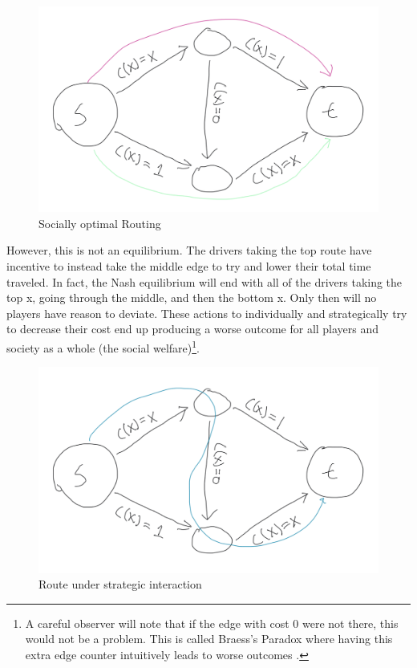 \documentclass[12pt,twoside]{reedthesis}
\begin{document}
\begin{figure}[h!]
	\centering
	\includegraphics[scale=0.35]{Figures/braess_optimal}
	\caption{Socially optimal Routing}
	\label{braess2}
\end{figure}

However, this is not an equilibrium. The drivers taking the top route have incentive to instead take the middle edge to try and lower their total time traveled. In fact, the Nash equilibrium will end with all of the drivers taking the top x, going through the middle, and then the bottom x. Only then will no players have reason to deviate. These actions to individually and strategically try to decrease their cost end up producing a worse outcome for all players and society as a whole (the social welfare)\footnote{A careful observer will note that if the edge with cost 0 were not there, this would not be a problem. This is called Braess's Paradox where having this extra edge counter intuitively leads to worse outcomes \citep{Braess1968}.}.  

\begin{figure}[h!]
	\centering
	\includegraphics[scale=0.35]{Figures/braess_selfish}
	\caption{Route under strategic interaction}
	\label{braess3}
\end{figure}
\end{document}
